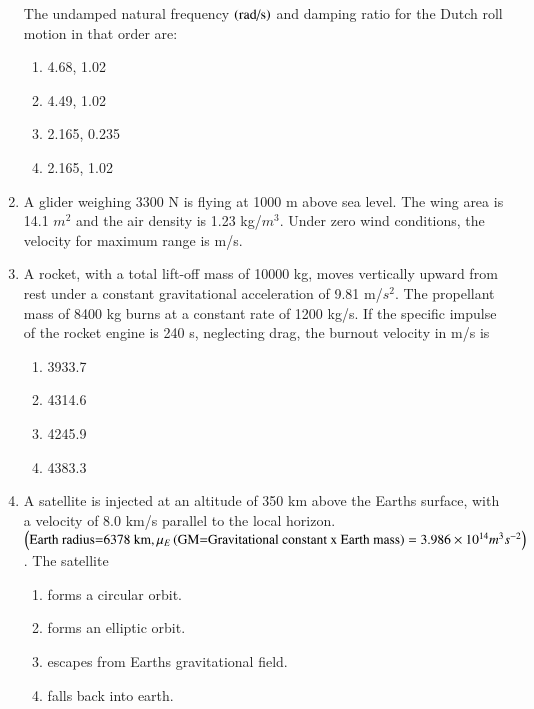 \documentclass[journal]{IEEEtran}
\numberwithin{equation}{enumi}
\numberwithin{figure}{enumi}
\begin{document}
\begin{enumerate}
The undamped natural frequency $\left(\text{rad/s}\right)$ and damping ratio for the Dutch roll motion in that order are:
\begin{enumerate}
\item 4.68, 1.02
\item 4.49, 1.02
\item 2.165, 0.235
\item 2.165, 1.02
\end{enumerate}
\item A glider weighing 3300 N is flying at 1000 m above sea level. The wing area is 14.1 $m^2$ and the air density is 1.23 kg/$m^3$. Under zero wind conditions, the velocity for maximum range is \underline{\hspace{1cm}} m/s.
	\begin{table}[H]
		\centering
		
	\end{table}
\item A rocket, with a total lift-off mass of 10000 kg, moves vertically upward from rest under a constant gravitational acceleration of 9.81 m/$s^2$. The propellant mass of 8400 kg burns at a constant rate of 1200 kg/s. If the specific impulse of the rocket engine is 240 s, neglecting drag, the burnout velocity in m/s is
\begin{enumerate}
\item 3933.7
\item 4314.6
\item 4245.9
\item 4383.3
\end{enumerate}
\item A satellite is injected at an altitude of 350 km above the Earths surface, with a velocity of 8.0 km/s parallel to the local horizon. $\left(\text{Earth radius=6378 km}, \mu_E \left(\text{GM=Gravitational
	constant x Earth mass}\right) = 3.986\times10^{14} m^3s^{-2}\right) $. The satellite
\begin{enumerate}
\item forms a circular orbit.
\item forms an elliptic orbit.
\item escapes from Earths gravitational field.
\item falls back into earth.
\end{enumerate}

\end{enumerate}
\end{document}
